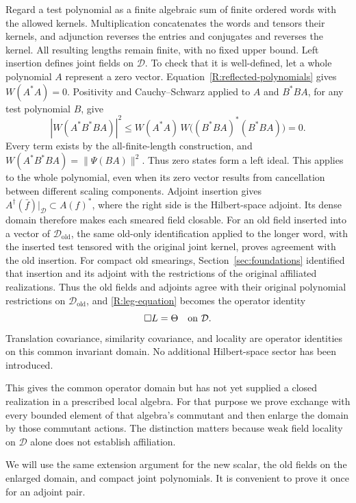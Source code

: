 Regard a test polynomial as a finite algebraic sum of finite ordered
words with the allowed kernels.  Multiplication concatenates the
words and tensors their kernels, and adjunction reverses the entries
and conjugates and reverses the kernel.  All resulting lengths remain
finite, with no fixed upper bound.  Left insertion defines joint
fields on $\mathcal D$.  To check that it is well-defined, let a whole
polynomial $A$ represent a zero vector.  Equation~\eqref{R:reflected-polynomials} gives
$W(A^*A)=0$.  Positivity and Cauchy--Schwarz applied to $A$ and
$B^*BA$, for any test polynomial $B$, give
\[
 |W(A^*B^*BA)|^2
 \leq W(A^*A)\,
       W\bigl((B^*BA)^*(B^*BA)\bigr)=0.
\]
Every term exists by the all-finite-length construction, and
$W(A^*B^*BA)=\|\Psi(BA)\|^2$.  Thus zero states form a left ideal.
This applies to the whole polynomial, even when its zero vector
results from cancellation between different scaling components.
Adjoint insertion gives
$A^\dagger(\bar f)|_{\mathcal D}\subset A(f)^*$, where the right
side is the Hilbert-space adjoint.  Its dense domain therefore makes
each smeared field closable.
For an old field inserted into a vector of
$\mathcal D_{\mathrm{old}}$, the same old-only identification applied to
the longer word, with the inserted test tensored with the original joint
kernel, proves agreement with the old insertion. For compact old smearings,
Section~\ref{sec:foundations} identified that insertion and its adjoint with
the restrictions of the original affiliated realizations. Thus the old fields and adjoints agree
with their original polynomial restrictions on
$\mathcal D_{\mathrm{old}}$, and
\eqref{R:leg-equation} becomes the operator identity
\begin{equation}\label{R:operator-leg}
 \Box L=\Theta\quad\hbox{on }\mathcal D.
\end{equation}
Translation covariance, similarity covariance, and locality are
operator identities on this common invariant domain.  No additional
Hilbert-space sector has been introduced.

This gives the common operator domain but has not yet supplied a
closed realization in a prescribed local algebra.  For that purpose
we prove exchange with every bounded element of that algebra's
commutant and then enlarge the domain by those commutant actions.
The distinction matters because weak field locality on
$\mathcal D$ alone does not establish affiliation.

We will use the same extension argument for the new scalar, the old
fields on the enlarged domain, and compact joint polynomials.  It is
convenient to prove it once for an adjoint pair.

